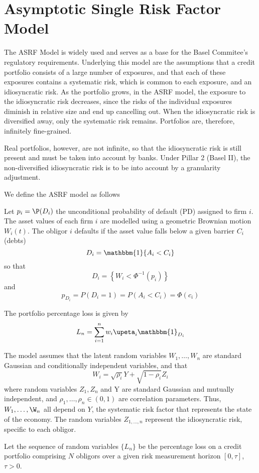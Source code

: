 \section{Asymptotic Single Risk Factor Model}

The ASRF Model is widely used and serves as a base for the Basel Commitee's regulatory requirements.
Underlying this model are the assumptions that a credit portfolio consists of a large number of exposures, and that each of these exposures contains a systematic risk, which is common to each exposure, and an idiosyncratic risk.
As the portfolio grows, in the ASRF model, the exposure to the idiosyncratic risk decreases, since the risks of the individual exposures diminish in relative size and end up cancelling out.
When the idiosyncratic risk is diversified away, only the systematic risk remains.
Portfolios are, therefore, infinitely fine-grained.

Real portfolios, however, are not infinite, so that the idiosyncratic risk is still present and must be taken into account by banks.
Under Pillar 2 (Basel II), the non-diversified idiosyncratic risk is to be into account by a granularity adjustment.

We define the ASRF model as follows

Let
$p_i = \P(D_i)$ the unconditional probability of default (PD) assigned to firm $i$.
The asset values of each firm $i$ are modelled using a geometric Brownian motion $W_i(t)$.
The obligor $i$ defaults if the asset value falls below a given barrier $C_i$ (debts)
\begin{equation}
	D_i = \mathbbm{1}{A_i < C_i}
\end{equation}
so that
\begin{equation}
	D_i = \left\{  W_i < \Phi^{-1}(p_i) \right\}
\end{equation}
and 
\begin{equation}
	p_D_i = P(D_i = 1) = P(A_i < C_i) = \Phi(c_i)
\end{equation}



The portfolio percentage loss is given by
\begin{equation}
	L_n = \sum_{i=1}^{n} w_i \upeta_i \mathbbm{1}_{D_i}
\end{equation}

The model assumes that the latent random variables $W_1,\ldots,W_n$ are standard Gaussian and conditionally independent variables, and that 
\begin{equation}
	W_i = \sqrt{\rho_i} Y + \sqrt{1-\rho_i} Z_i
\end{equation}
where random variables $Z_1, Z_n$ and Y are standard Gaussian and mutually independent, and $\rho_1, \ldots, \rho_n \in (0,1)$ are correlation parameters.
Thus, $W_1, \ldots, \W_n$ all depend on $Y$, the systematic risk factor that represents the state of the economy.
The random variables $Z_{1,\ldots,n}$ represent the idiosyncratic risk, specific to each obligor.

Let the sequence of random variables $\{L_n\}$ be the percentage loss on a credit portfolio comprising $N$ obligors over a given risk measurement horizon $[0, \tau]$, $\tau > 0$.
